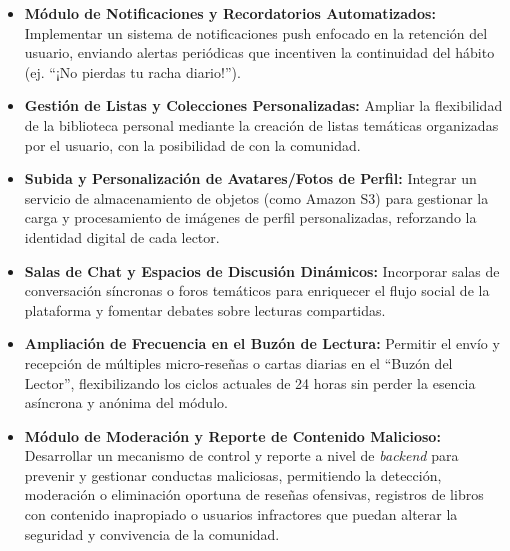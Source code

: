 \documentclass[12pt, atypical, journal]{article}
\begin{document}
\begin{itemize}
    \item \textbf{Módulo de Notificaciones y Recordatorios Automatizados:} Implementar un sistema de notificaciones push enfocado en la retención del usuario, enviando alertas periódicas que incentiven la continuidad del hábito (ej. ``¡No pierdas tu racha diario!'').
    \item \textbf{Gestión de Listas y Colecciones Personalizadas:} Ampliar la flexibilidad de la biblioteca personal mediante la creación de listas temáticas organizadas por el usuario, con la posibilidad de con la comunidad.
    \item \textbf{Subida y Personalización de Avatares/Fotos de Perfil:} Integrar un servicio de almacenamiento de objetos (como Amazon S3) para gestionar la carga y procesamiento de imágenes de perfil personalizadas, reforzando la identidad digital de cada lector.
    \item \textbf{Salas de Chat y Espacios de Discusión Dinámicos:} Incorporar salas de conversación síncronas o foros temáticos para enriquecer el flujo social de la plataforma y fomentar debates sobre lecturas compartidas.
    \item \textbf{Ampliación de Frecuencia en el Buzón de Lectura:} Permitir el envío y recepción de múltiples micro-reseñas o cartas diarias en el ``Buzón del Lector'', flexibilizando los ciclos actuales de 24 horas sin perder la esencia asíncrona y anónima del módulo.
    \item \textbf{Módulo de Moderación y Reporte de Contenido Malicioso:} Desarrollar un mecanismo de control y reporte a nivel de \textit{backend} para prevenir y gestionar conductas maliciosas, permitiendo la detección, moderación o eliminación oportuna de reseñas ofensivas, registros de libros con contenido inapropiado o usuarios infractores que puedan alterar la seguridad y convivencia de la comunidad.
\end{itemize}

\newpage
\end{document}
